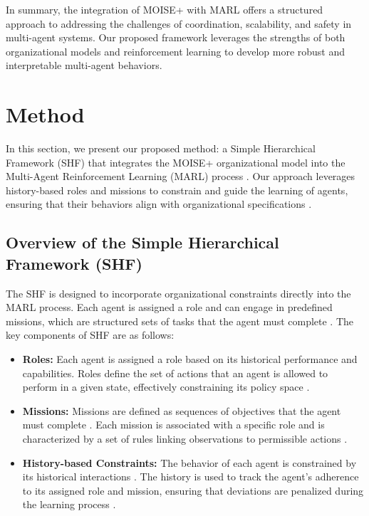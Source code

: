 \documentclass[sigconf,anonymous]{aamas}
\begin{document}
In summary, the integration of MOISE+ with MARL offers a structured approach to addressing the challenges of coordination, scalability, and safety in multi-agent systems. Our proposed framework leverages the strengths of both organizational models and reinforcement learning to develop more robust and interpretable multi-agent behaviors.


\section{Method}
\label{sec:method}

In this section, we present our proposed method: a Simple Hierarchical Framework (SHF) that integrates the MOISE+ organizational model into the Multi-Agent Reinforcement Learning (MARL) process \cite{hubner2010moise}. Our approach leverages history-based roles and missions to constrain and guide the learning of agents, ensuring that their behaviors align with organizational specifications \cite{hubner2007using, soule2024}.


\subsection{Overview of the Simple Hierarchical Framework (SHF)}
The SHF is designed to incorporate organizational constraints directly into the MARL process. Each agent is assigned a role and can engage in predefined missions, which are structured sets of tasks that the agent must complete \cite{hubner2010moise}. The key components of SHF are as follows:

\begin{itemize}
    \item \textbf{Roles:} Each agent is assigned a role based on its historical performance and capabilities. Roles define the set of actions that an agent is allowed to perform in a given state, effectively constraining its policy space \cite{hubner2010moise, castaneda2019policy}.
    \item \textbf{Missions:} Missions are defined as sequences of objectives that the agent must complete \cite{hubner2010moise}. Each mission is associated with a specific role and is characterized by a set of rules linking observations to permissible actions \cite{hernandez2019survey}.
    \item \textbf{History-based Constraints:} The behavior of each agent is constrained by its historical interactions \cite{foerster2018counterfactual}. The history is used to track the agent's adherence to its assigned role and mission, ensuring that deviations are penalized during the learning process \cite{wei2019safe}.
\end{itemize}
\end{document}
